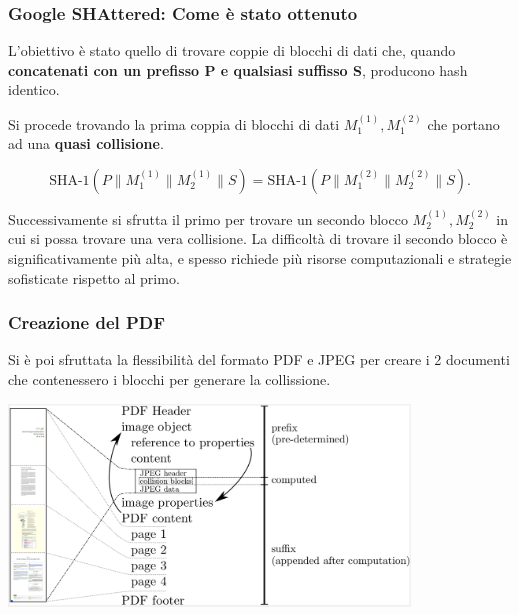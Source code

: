 \begin{frame}
	\frametitle{Google SHAttered: Come è stato ottenuto}

	L'obiettivo è stato quello di trovare coppie di blocchi di dati che, quando \textbf{concatenati con un prefisso P e qualsiasi suffisso S}, producono hash identico.

	Si procede trovando la prima coppia di blocchi di dati \(M_{1}^{(1)}, M_{1}^{(2)}\) che portano ad una \textbf{quasi collisione}.

	\[
		\text{SHA-1} \left( P \parallel M_{1}^{(1)} \parallel M_{2}^{(1)} \parallel S \right) = \text{SHA-1} \left( P \parallel M_{1}^{(2)} \parallel M_{2}^{(2)} \parallel S \right).
	\]


	Successivamente si sfrutta il primo per trovare un secondo blocco \(M_{2}^{(1)}, M_{2}^{(2)}\) in cui si possa trovare una vera collisione.
	La difficoltà di trovare il secondo blocco è significativamente più alta, e spesso richiede più risorse computazionali e strategie sofisticate rispetto al primo.

\end{frame}

\begin{frame}
	\frametitle{Creazione del PDF}

	Si è poi sfruttata la flessibilità del formato PDF e JPEG per creare i 2 documenti che contenessero i blocchi per generare la collissione.

	\begin{center}
		\includegraphics[width=0.8\textwidth]{img/2-img/pdf_format.png}
	\end{center}

\end{frame}